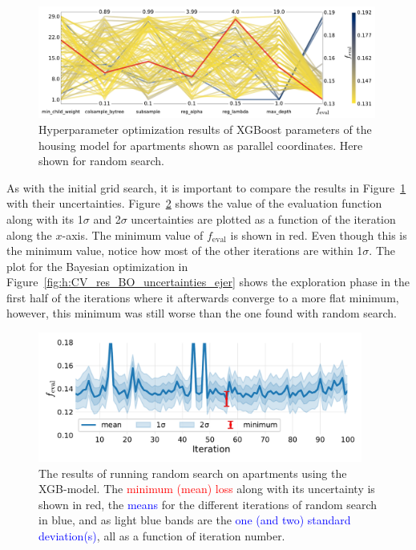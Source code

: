 \begin{figure}
  \centerfloat
  \includegraphics[width=0.99\textwidth, trim=0 0 0 0, clip]{figures/housing/Ejerlejlighed_v19_cut_all_Ncols_all_CV_viz_HPO_RS.pdf}
  \caption[Parallel Coordinate Plot of the Random Search Hyperparameter Optimization Results of XGBoost for Apartments]
          {Hyperparameter optimization results of XGBoost parameters of the housing model for apartments shown as parallel coordinates. Here shown for random search. } 
  \label{fig:h:CV_res_RS_parallel_coords_ejer_non_appendix}
\end{figure}

As with the initial grid search, it is important to compare the results in Figure~\ref{fig:h:CV_res_RS_parallel_coords_ejer_non_appendix} with their uncertainties. Figure~\ref{fig:h:CV_res_RS_uncertainties_ejer} shows the value of the evaluation function along with its \num{1}$\sigma$  and \num{2}$\sigma$ uncertainties are plotted as a function of the iteration along the $x$-axis. The minimum value of $f_\mathrm{eval}$ is shown in red. Even though this is the minimum value, notice how most of the other iterations are within \num{1}$\sigma$. The plot for the Bayesian optimization in Figure~\ref{fig:h:CV_res_BO_uncertainties_ejer} shows the exploration phase in the first half of the iterations where it afterwards converge to a more flat minimum, however, this minimum was still worse than the one found with random search. 

\begin{figure}
  \centerfloat
  \includegraphics[width=0.95\textwidth, trim=10 20 10 10, clip]{figures/housing/Ejerlejlighed_v19_cut_all_Ncols_all_xgb_score_over_time_random.pdf}
  \caption[Hyperparameter Optimization: Random Search Results]
          {The results of running random search on apartments using the XGB-model. The \textcolor{red}{minimum (mean) loss} along with its uncertainty is shown in red, the \textcolor{blue}{means} for the different iterations of random search in blue, and as light blue bands are the \textcolor{blue}{one (and two) standard deviation(s)}, all as a function of iteration number.} 
  \label{fig:h:CV_res_RS_uncertainties_ejer}
\end{figure}

